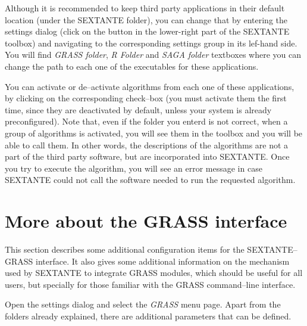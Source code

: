 Although it is recommended to keep third party applications in their default location (under the SEXTANTE folder), you can change that by entering the settings dialog (click on the button in the lower-right part of the SEXTANTE toolbox) and navigating to the corresponding settings group in its lef-hand side. You will find \emph{GRASS folder}, \emph{R Folder} and \emph{SAGA folder} textboxes where you can change the path to each one of the executables for these applications.

You can activate or de--activate algorithms from each one of these applications, by clicking on the corresponding check--box (you must activate them the first time, since they are deactivated by default, unless your system is already preconfigured). Note that, even if the folder you enterd is not correct, when a group of algorithms is activated, you will see them in the toolbox and you will be able to call them. In other words, the descriptions of the algorithms are not a part of the third party software, but are incorporated into SEXTANTE. Once you try to execute the algorithm, you will see an error message in case SEXTANTE could not call the software needed to run the requested algorithm.


\section{More about the GRASS interface}

This section describes some additional configuration items for the SEXTANTE--GRASS interface. It also gives some additional information on the mechanism used by SEXTANTE to integrate GRASS modules, which should be useful for all users, but specially for those familiar with the GRASS command--line interface.

Open the settings dialog and select the \emph{GRASS} menu page.  Apart from the folders already explained, there are additional parameters that can be defined.

